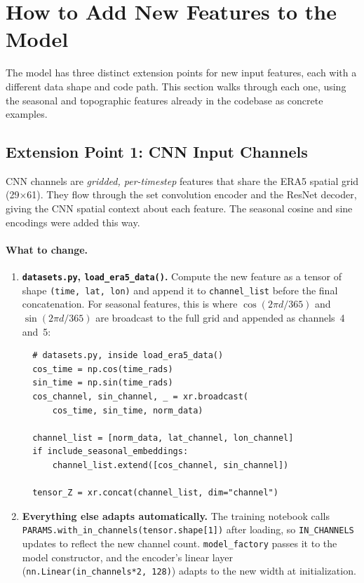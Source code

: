 \section{How to Add New Features to the Model}
\label{sec:adding-features}

The model has three distinct extension points for new input features, each with a different data shape and code path.
This section walks through each one, using the seasonal and topographic features already in the codebase as concrete examples.

\subsection{Extension Point 1: CNN Input Channels}

CNN channels are \emph{gridded, per-timestep} features that share the ERA5 spatial grid (29$\times$61).
They flow through the set convolution encoder and the ResNet decoder, giving the CNN spatial context about each feature.
The seasonal cosine and sine encodings were added this way.

\paragraph{What to change.}

\begin{enumerate}
  \item \textbf{\texttt{datasets.py}, \texttt{load\_era5\_data()}.}
  Compute the new feature as a tensor of shape \texttt{(time, lat, lon)} and append it to \texttt{channel\_list} before the final concatenation.
  For seasonal features, this is where $\cos(2\pi d/365)$ and $\sin(2\pi d/365)$ are broadcast to the full grid and appended as channels~4 and~5:

\begin{verbatim}
  # datasets.py, inside load_era5_data()
  cos_time = np.cos(time_rads)
  sin_time = np.sin(time_rads)
  cos_channel, sin_channel, _ = xr.broadcast(
      cos_time, sin_time, norm_data)

  channel_list = [norm_data, lat_channel, lon_channel]
  if include_seasonal_embeddings:
      channel_list.extend([cos_channel, sin_channel])

  tensor_Z = xr.concat(channel_list, dim="channel")
\end{verbatim}

  \item \textbf{Everything else adapts automatically.}
  The training notebook calls \texttt{PARAMS.with\_in\_channels(tensor.shape[1])} after loading, so \texttt{IN\_CHANNELS} updates to reflect the new channel count.
  \texttt{model\_factory} passes it to the model constructor, and the encoder's linear layer (\texttt{nn.Linear(in\_channels*2, 128)}) adapts to the new width at initialization.
\end{enumerate}


